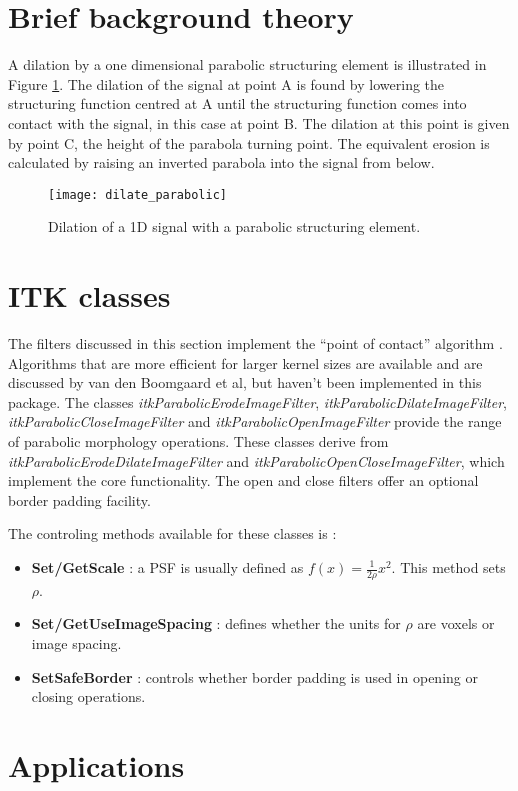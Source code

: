 \documentclass{InsightArticle}
\begin{document}
\section{Brief background theory}
A dilation by a one dimensional parabolic structuring element is
illustrated in Figure \ref{fig:paradilate}. The dilation of the signal
at point A is found by lowering the structuring function centred at A
until the structuring function comes into contact with the signal, in
this case at point B. The dilation at this point is given by point C,
the height of the parabola turning point. The equivalent erosion is
calculated by raising an inverted parabola into the signal from below.

\begin{figure}[htbp]
\centering
\texttt{[image: dilate\_parabolic]}
\caption{Dilation of a 1D signal with a parabolic structuring element.\label{fig:paradilate}}
\end{figure}

\section{ITK classes}
The filters discussed in this section implement the ``point of
contact'' algorithm \cite{Boomgaard96}. Algorithms that are more
efficient for larger kernel sizes are available and are discussed by
van den Boomgaard et al, but haven't been implemented in this package.
The classes {\em itkParabolicErodeImageFilter}, {\em
itkParabolicDilateImageFilter}, {\em itkParabolicCloseImageFilter} and
{\em itkParabolicOpenImageFilter} provide the range of parabolic
morphology operations. These classes derive from {\em
itkParabolicErodeDilateImageFilter} and {\em
itkParabolicOpenCloseImageFilter}, which implement the core
functionality. The open and close filters offer an optional border
padding facility.

The controling methods available for these classes is :
\begin{itemize}
\item {\bf Set/GetScale} : a PSF is usually defined as $f(x)=\frac{1}{2\rho}x^2$. This method sets $\rho$.
\item {\bf Set/GetUseImageSpacing} : defines whether the units for $\rho$ are voxels or image spacing.
\item {\bf SetSafeBorder} : controls whether border padding is used in opening or closing operations.
\end{itemize}

\section{Applications}
\end{document}
